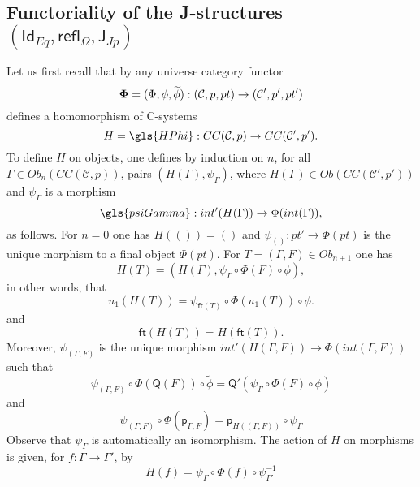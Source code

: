 \documentclass[12pt]{article}
\numberwithin{equation}{section}
\newenvironment{eq}{\begin{equation}}{\end{equation}}
\newcommand{\sr}{\rightarrow}
\newcommand{\wt}{\widetilde}
\newcommand{\toCC}{CC} %
\newcommand{\C}{{\mathcal C}}  %
\newcommand{\ft}{\mathsf{ft}}
\newcommand{\p}{\mathsf{p}}
\newcommand{\Id}{\mathsf{Id}} %
\newcommand{\refl}{\mathsf{refl}}
\newcommand{\J}{\mathsf{J}}
\newcommand{\Q}{\mathsf{Q}}
\begin{document}
\subsection{Functoriality of the J-structures $(\Id_{Eq},\refl_{\Omega},\J_{Jp})$}
%
\label{2015.04.12.sec1}
%
Let us first recall that by \cite[Construction 3.3]{Cfromauniverse} any
universe category functor $${\bf \Phi}=(\Phi,\phi,\wt{\phi}) : (\C,p,pt) \to (\C',p',pt')$$ defines a
homomorphism of C-systems
%
$$H = \gls{HPhi} :\toCC({\C},p)\sr \toCC({\C}',p').$$
%
To define $H$ on objects, one defines by induction on $n$, for all $\Gamma\in
Ob_n(\toCC({\C},p))$, pairs $(H(\Gamma),\psi_{\Gamma})$, where
$H(\Gamma)\in Ob(\toCC({\C}',p'))$ and $\psi_{\Gamma}$ is a morphism
%
$$\gls{psiGamma} : int'(H(\Gamma))\sr \Phi(int(\Gamma)),$$
%
as follows. For $n=0$ one has $H(())=()$ and $\psi_{()}:pt'\sr \Phi(pt)$ is the
unique morphism to a final object $\Phi(pt)$. For $T = (\Gamma,F)\in Ob_{n+1}$ one
has
%
$$H(T)=(H(\Gamma),\psi_{\Gamma}\circ\Phi(F)\circ \phi),$$
%
in other words, that
\begin{eq}
  \label{u1-H-eqn}
  u_1(H(T)) = \psi_{\ft(T)} \circ \Phi(u_1(T)) \circ \phi.
\end{eq}%
and
\begin{eq}
  \label{ft-H-eqn}
  \ft(H(T)) = H(\ft(T)).
\end{eq}%
Moreover, $\psi_{(\Gamma,F)}$ is the unique morphism $int'(H(\Gamma,F))\sr \Phi(int(\Gamma,F))$ such that
%
\begin{eq}
  \label{psi-Q-compat}
  \psi_{(\Gamma,F)}\circ \Phi(\Q(F))\circ\wt{\phi}=\Q'(\psi_{\Gamma}\circ\Phi(F)\circ\phi)
\end{eq}%
and
\begin{eq}
  \label{psi-p-compat}
  \psi_{(\Gamma,F)}\circ \Phi(\p_{\Gamma,F})=\p_{H((\Gamma,F))}\circ \psi_{\Gamma}
\end{eq}%
Observe that $\psi_{\Gamma}$ is automatically an isomorphism. The action of $H$
on morphisms is given, for $f:\Gamma\sr\Gamma'$, by
%
$$H(f)=\psi_{\Gamma}\circ\Phi(f)\circ\psi_{\Gamma'}^{-1}$$
%
\end{document}
